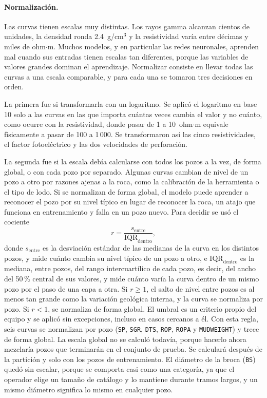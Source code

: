 \documentclass[11pt,a4paper]{article}
\begin{document}
\paragraph{Normalización.} Las curvas tienen escalas muy distintas. Los rayos gamma alcanzan cientos de unidades, la densidad ronda 2.4~g/cm$^3$ y la resistividad varía entre décimas y miles de ohm$\cdot$m. Muchos modelos, y en particular las redes neuronales, aprenden mal cuando sus entradas tienen escalas tan diferentes, porque las variables de valores grandes dominan el aprendizaje. Normalizar consiste en llevar todas las curvas a una escala comparable, y para cada una se tomaron tres decisiones en orden.

La primera fue si transformarla con un logaritmo. Se aplicó el logaritmo en base 10 solo a las curvas en las que importa cuántas veces cambia el valor y no cuánto, como ocurre con la resistividad, donde pasar de 1 a 10~ohm$\cdot$m equivale físicamente a pasar de 100 a 1\,000. Se transformaron así las cinco resistividades, el factor fotoeléctrico y las dos velocidades de perforación.

La segunda fue si la escala debía calcularse con todos los pozos a la vez, de forma global, o con cada pozo por separado. Algunas curvas cambian de nivel de un pozo a otro por razones ajenas a la roca, como la calibración de la herramienta o el tipo de lodo. Si se normalizan de forma global, el modelo puede aprender a reconocer el pozo por su nivel típico en lugar de reconocer la roca, un atajo que funciona en entrenamiento y falla en un pozo nuevo. Para decidir se usó el cociente
\begin{equation}
r = \frac{s_{\text{entre}}}{\mathrm{IQR}_{\text{dentro}}} ,
\end{equation}
donde $s_{\text{entre}}$ es la desviación estándar de las medianas de la curva en los distintos pozos, y mide cuánto cambia su nivel típico de un pozo a otro, e $\mathrm{IQR}_{\text{dentro}}$ es la mediana, entre pozos, del rango intercuartílico de cada pozo, es decir, del ancho del 50\,\% central de sus valores, y mide cuánto varía la curva dentro de un mismo pozo por el paso de una capa a otra. Si $r \geq 1$, el salto de nivel entre pozos es al menos tan grande como la variación geológica interna, y la curva se normaliza por pozo. Si $r < 1$, se normaliza de forma global. El umbral es un criterio propio del equipo y se aplicó sin excepciones, incluso en casos cercanos a él. Con esta regla, seis curvas se normalizan por pozo (\texttt{SP}, \texttt{SGR}, \texttt{DTS}, \texttt{ROP}, \texttt{ROPA} y \texttt{MUDWEIGHT}) y trece de forma global. La escala global no se calculó todavía, porque hacerlo ahora mezclaría pozos que terminarán en el conjunto de prueba. Se calculará después de la partición y solo con los pozos de entrenamiento. El diámetro de la broca (\texttt{BS}) quedó sin escalar, porque se comporta casi como una categoría, ya que el operador elige un tamaño de catálogo y lo mantiene durante tramos largos, y un mismo diámetro significa lo mismo en cualquier pozo.
\end{document}

